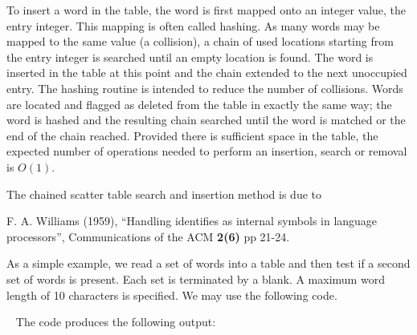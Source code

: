 \documentclass{galahad}
\begin{document}

\galmethod

To insert a word in the table, the word is first mapped onto an
integer value, the entry integer.  This mapping is often called
hashing. As many words may be mapped to the same value (a collision),
a chain of used locations starting from the entry integer is searched
until an empty location is found. The word is inserted in the table at
this point and the chain extended to the next unoccupied entry. The
hashing routine is intended to reduce the number of collisions.  Words
are located and flagged as deleted from the table in exactly the same
way; the word is hashed and the resulting chain searched until the
word is matched or the end of the chain reached.  Provided there is
sufficient space in the table, the expected number of operations
needed to perform an insertion, search or removal is $O(1)$.

\galreferences
\vspace*{1mm}

\noindent
The chained scatter table search and insertion method is due to 
\vspace*{1mm}

\noindent
F. A.  Williams (1959),
``Handling identifies as internal symbols in language processors'',
Communications of the ACM {\bf 2(6)} pp 21-24.


\galexamples
As a simple example, we read a set of words into a table and then
test if a second set of words is present. Each set is terminated by a
blank.  A maximum word length of 10 characters is specified.  We may
use the following code.

{\tt \small
\VerbatimInput{\packageexample}
}
\noindent
The code produces the following output:
{\tt \small
\VerbatimInput{\packageresults}
}
\end{document}
